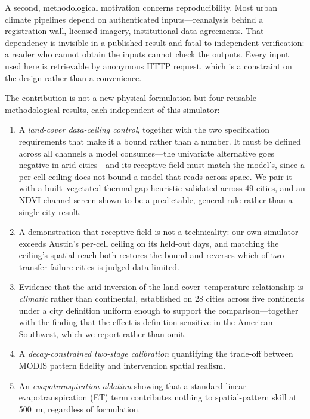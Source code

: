 \documentclass[remotesensing,article,submit,oneauthor]{Definitions/mdpi}
\begin{document}
A second, methodological motivation concerns reproducibility. Most urban
climate pipelines depend on authenticated inputs---reanalysis behind a
registration wall, licensed imagery, institutional data agreements. That
dependency is invisible in a published result and fatal to independent
verification: a reader who cannot obtain the inputs cannot check the
outputs. Every input used here is retrievable by anonymous HTTP request,
which is a constraint on the design rather than a convenience.

The contribution is not a new physical formulation but four reusable
methodological results, each independent of this simulator:

\begin{enumerate}
\item A \emph{land-cover data-ceiling control}, together with the two
specification requirements that make it a bound rather than a number.
It must be defined across all channels a model consumes---the univariate
alternative goes negative in arid cities---and its receptive field must
match the model's, since a per-cell ceiling does not bound a model that
reads across space. We pair it with a built--vegetated thermal-gap
heuristic validated across 49 cities, and an NDVI channel screen shown to
be a predictable, general rule rather than a single-city result.
\item A demonstration that receptive field is not a technicality: our own
simulator exceeds Austin's per-cell ceiling on its held-out days, and
matching the ceiling's spatial reach both restores the bound and reverses
which of two transfer-failure cities is judged data-limited.
\item Evidence that the arid inversion of the land-cover--temperature
relationship is \emph{climatic} rather than continental, established on 28
cities across five continents under a city definition uniform enough to
support the comparison---together with the finding that the effect is
definition-sensitive in the American Southwest, which we report rather
than omit.
\item A \emph{decay-constrained two-stage calibration} quantifying the
trade-off between MODIS pattern fidelity and intervention spatial
realism.
\item An \emph{evapotranspiration ablation} showing that a standard linear
evapotranspiration (ET) term contributes nothing to spatial-pattern skill
at 500~m, regardless of formulation.
\end{enumerate}
\end{document}

